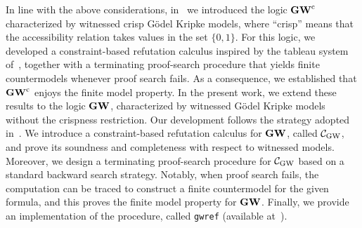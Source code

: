 In line with the above considerations, in~\cite{FerFioRod:2025} we
introduced the logic $\mathbf{GW}^\mathrm{c}$ characterized by witnessed crisp G\"odel
Kripke models, where ``crisp'' means that the accessibility relation
takes values in the set $\{0,1\}$.  For this logic, we developed a
constraint-based refutation calculus inspired by the tableau system
of~\cite{BilkovaFK:22}, together with a terminating proof-search
procedure that yields finite countermodels whenever proof search
fails. As a consequence, we established that $\mathbf{GW}^\mathrm{c}$ enjoys the finite
model property.  In the present work, we extend these results to the
logic $\mathbf{GW}$, characterized by witnessed G\"odel Kripke models without
the crispness restriction. Our development follows the
strategy adopted in~\cite{FerFioRod:2025}.  We introduce a
constraint-based refutation calculus for $\mathbf{GW}$, called $\mathcal{C}_{\mathrm{GW}}$, and
prove its soundness and completeness with respect to witnessed
models. Moreover, we design a terminating proof-search procedure for
$\mathcal{C}_{\mathrm{GW}}$ based on a standard backward search strategy.  Notably, when
proof search fails, the computation can be traced to construct a
finite countermodel for the given formula, and this proves the finite
model property for $\mathbf{GW}$.  Finally, we provide an implementation of
the procedure, called \texttt{gwref} (available
at~\cite{gwrefProver}).




